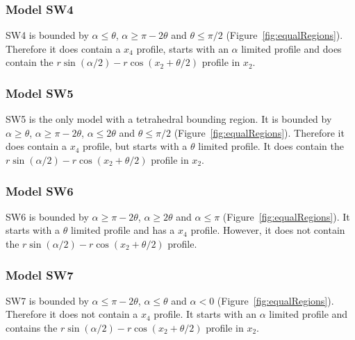 \subsubsection{Model SW4} \label{SW4}

SW4 is bounded by $\alpha \le \theta$, $\alpha \ge \pi - 2\theta$ and $\theta \le \pi/2$ (Figure~\ref{fig:equalRegions}).
Therefore it does contain a $x_4$ profile, starts with an $\alpha$ limited profile and does contain the $r\sin(\alpha/2) - r\cos(x_2 + \theta/2)$ profile in $x_2$.



\subsubsection{Model SW5} \label{SW5}

SW5 is the only model with a tetrahedral bounding region.
It is bounded by $\alpha \ge \theta$, $\alpha \ge \pi - 2\theta$, $\alpha \le 2\theta$ and $\theta \le \pi/2$ (Figure~\ref{fig:equalRegions}).
Therefore it does contain a $x_4$ profile, but starts with a $\theta$ limited profile.
It does contain the $r\sin(\alpha/2) - r\cos(x_2 + \theta/2)$ profile in $x_2$.



\subsubsection{Model SW6} \label{SW6}

SW6 is bounded by $\alpha \ge \pi - 2\theta$,  $\alpha \ge 2\theta$ and $\alpha \le \pi$ (Figure~\ref{fig:equalRegions}).
It starts with a $\theta$ limited profile and has a $x_4$ profile.
However, it does not contain the $r\sin(\alpha/2) - r\cos(x_2 + \theta/2)$ profile.




\subsubsection{Model SW7} \label{SW7}

SW7 is bounded by $\alpha \le \pi - 2\theta$, $\alpha \le \theta$ and $\alpha < 0$ (Figure~\ref{fig:equalRegions}).
Therefore it does not contain a $x_4$ profile.
It starts with an $\alpha$ limited profile and contains the $r\sin(\alpha/2) - r\cos(x_2 + \theta/2)$ profile in $x_2$.




